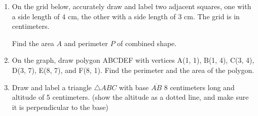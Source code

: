 \begin{enumerate}
  \item On the grid below, accurately draw and label two adjacent squares, one with a side length of 4 cm, the other with a side length of 3 cm. The grid is in centimeters. \par \medskip
    Find the area $A$ and perimeter $P$ of combined shape.
    \begin{flushleft}
    \end{flushleft}
  
  \item On the graph, draw polygon ABCDEF with vertices A(1, 1), B(1, 4), C(3, 4), D(3, 7), E(8, 7), and F(8, 1). Find the perimeter and the area of the polygon.
  \begin{flushleft}
    \end{flushleft}
  
  \item Draw and label a triangle $\triangle ABC$ with base $\overline{AB}$ 8 centimeters long and altitude of 5 centimeters. (show the altitude as a dotted line, and make sure it is perpendicular to the base) 
  
  

\end{enumerate}
